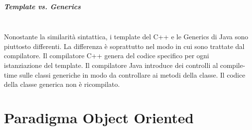 \documentclass[12pt]{report}
\begin{document}
\paragraph{Template vs. Generics} \quad \\
Nonostante la similarità sintattica, i template del C++ e le Generics di Java sono piuttosto differenti. La differenza è soprattutto nel modo in cui sono trattate dal compilatore. Il compilatore C++ genera del codice specifico per ogni istanziazione del template. Il compilatore Java introduce dei controlli al compile-time sulle classi generiche in modo da controllare  ai metodi della classe. Il codice della classe generica non è ricompilato.
\chapter{Paradigma Object Oriented}
\end{document}
